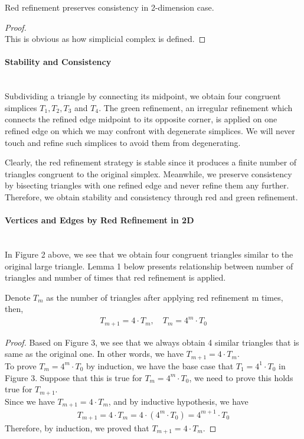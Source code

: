     \begin{lemma*}
    Red refinement preserves consistency in 2-dimension case.
    \end{lemma*}
    \begin{proof}\mbox{}\\
    This is obvious as how simplicial complex is defined.
    \end{proof}

    \paragraph{Stability and Consistency}\mbox{}\\
    Subdividing a triangle by connecting its midpoint, we obtain four congruent simplices $T_1, T_2, T_3$ and $T_4$. The green refinement, an irregular refinement which connects the refined edge midpoint to its opposite corner, is applied on one refined edge on which we may confront with degenerate simplices. We will never touch and refine such simplices to avoid them from degenerating.

    Clearly, the red refinement strategy is stable since it produces a finite number of triangles congruent to the original simplex. Meanwhile, we preserve consistency by bisecting triangles with one refined edge and never refine them any further. Therefore, we obtain stability and consistency through red and green refinement.

    \paragraph{Vertices and Edges by Red Refinement in 2D}\mbox{}\\
    In Figure 2 above, we see that we obtain four congruent triangles similar to the original large triangle. Lemma 1 below presents relationship between number of triangles and number of times that red refinement is applied.

    \begin{lemma}
    Denote $T_{m}$ as the number of triangles after applying red refinement m times, then,
    \begin{align*}
    T_{m+1} = 4 \cdot T_{m}, \quad T_{m} = 4^m \cdot T_0
    \end{align*}
    \end{lemma}
    \begin{proof}
    Based on Figure 3, we see that we always obtain 4 similar triangles that is same as the original one. In other words, we have $T_{m+1} = 4 \cdot T_{m}$.\\
    To prove $T_{m} = 4^m \cdot T_0$ by induction, we have the base case that $T_1 = 4^1 \cdot T_0$ in Figure 3. Suppose that this is true for $T_{m} = 4^m \cdot T_0$, we need to prove this holds true for $T_{m+1}$.\\
    Since we have $T_{m+1} = 4 \cdot T_{m}$, and by inductive hypothesis, we have
    \begin{align*}
    T_{m+1} = 4 \cdot T_{m} = 4 \cdot (4^m\cdot T_0) = 4^{m+1}\cdot T_0
    \end{align*}
    Therefore, by induction, we proved that $T_{m+1} = 4 \cdot T_{m}$.
    \end{proof}

